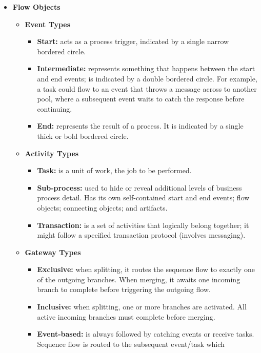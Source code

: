 \documentclass[11pt, a4paper, oneside, openright]{article}
\begin{document}
\begin{itemize}
  \item \textbf{Flow Objects}
  \begin{itemize}
    \item \textbf{Event Types}
    \begin{itemize}
      \item \textbf{Start:} acts as a process trigger, indicated by a single
      narrow bordered circle.
      \item \textbf{Intermediate:} represents something that happens between the
      start and end events; is indicated by a double bordered circle. For
      example, a task could flow to an event that throws a message across to
      another pool, where a subsequent event waits to catch the response before
      continuing.
      \item \textbf{End:} represents the result of a process. It is indicated by a
      single thick or bold bordered circle.
    \end{itemize}
    \item \textbf{Activity Types}
    \begin{itemize}
      \item \textbf{Task:} is a unit of work, the job to be performed.
      \item \textbf{Sub-process:} used to hide or reveal additional levels of
      business process detail. Has its own self-contained start and end events;
      flow objects; connecting objects; and artifacts.
      \item \textbf{Transaction:} is a set of activities that logically belong
      together; it might follow a specified transaction protocol (involves
      messaging).
    \end{itemize}
    \item \textbf{Gateway Types}
    \begin{itemize}
      \item \textbf{Exclusive:} when splitting, it routes the sequence flow to
      exactly one of the outgoing branches. When merging, it awaits one incoming
      branch to complete before triggering the outgoing flow.
      \item \textbf{Inclusive:} when splitting, one or more branches are
      activated. All active incoming branches must complete before merging.
      \item \textbf{Event-based:} is always followed by catching events or
      receive tasks. Sequence flow is routed to the subsequent event/task which

\end{itemize}
\end{itemize}
\end{itemize}
\end{document}
